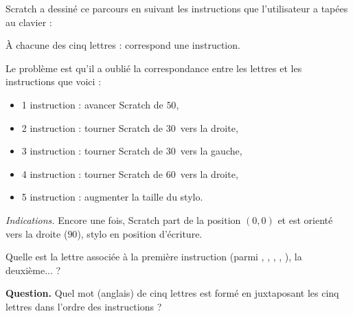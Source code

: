 \documentclass[class=report,crop=false, 12pt]{standalone}
\begin{document}
\begin{enigme}
Scratch a dessiné ce parcours en suivant les instructions que l'utilisateur a tapées au clavier :

\centerline{}


À chacune des cinq lettres :  correspond une instruction.

Le problème est qu'il a oublié la correspondance entre les lettres et les instructions que voici :
\begin{itemize}
  \item 1\iere{} instruction : avancer Scratch de $50$,
  \item 2\ieme{} instruction : tourner Scratch de $30$\textdegree\ vers la droite,  
  \item 3\ieme{} instruction : tourner Scratch de $30$\textdegree\ vers la gauche,  
  \item 4\ieme{} instruction : tourner Scratch de $60$\textdegree\ vers la droite,   
  \item 5\ieme{} instruction : augmenter la taille du stylo.  
\end{itemize}

\bigskip

\emph{Indications.}
Encore une fois, Scratch part de la position $(0,0)$ et est orienté vers la droite ($90$\textdegree), stylo en position d'écriture.


Quelle est la lettre associée à la première instruction (parmi , , , , ),
la deuxième... ? %

\bigskip

\textbf{Question.} Quel mot (anglais) de cinq lettres est formé en juxtaposant les cinq lettres dans l'ordre des instructions ?




\end{enigme}
\end{document}
